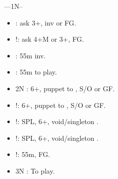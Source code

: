 \documentclass[12pt,twoside,a5paper]{report}%
\begin{document}
	----1N--%
	\begin{itemize}
	\renewcommand{\labelitemi}{}
	\item {} : ask 3+\di{}, inv or FG.
	\item {}!: ask 4+M or 3+\di{}, FG.
	\item {} : 55m inv.
	\item {} : 55m to play.
	\item 2N : 6+\cl{}, puppet to , S/O or GF.
	\item {}!: 6+\di{}, puppet to , S/O or GF.
	\item {}!: SPL, 6+\di{}, void/singleton \he{}.
	\item {}!: SPL, 6+\di{}, void/singleton \sp{}.
	\item {}!: 55m, FG.
	\item 3N : To play.
	\end{itemize}


\end{document}

